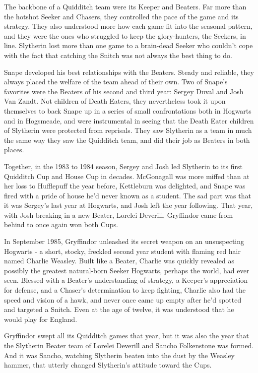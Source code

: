 \documentclass[a4paper,11pt]{article}
\begin{document}
The backbone of a Quidditch team were its Keeper and Beaters. Far more than the hotshot Seeker and Chasers, they controlled the pace of the game and its strategy. They also understood more how each game fit into the seasonal pattern, and they were the ones who struggled to keep the glory-hunters, the Seekers, in line. Slytherin lost more than one game to a brain-dead Seeker who couldn't cope with the fact that catching the Snitch was not always the best thing to do.

Snape developed his best relationships with the Beaters. Steady and reliable, they always placed the welfare of the team ahead of their own. Two of Snape's favorites were the Beaters of his second and third year: Sergey Duval and Josh Van Zandt. Not children of Death Eaters, they nevertheless took it upon themselves to back Snape up in a series of small confrontations both in Hogwarts and in Hogsmeade, and were instrumental in seeing that the Death Eater children of Slytherin were protected from reprisals. They saw Slytherin as a team in much the same way they saw the Quidditch team, and did their job as Beaters in both places.

Together, in the 1983 to 1984 season, Sergey and Josh led Slytherin to its first Quidditch Cup and House Cup in decades. McGonagall was more miffed than at her loss to Hufflepuff the year before, Kettleburn was delighted, and Snape was fired with a pride of house he'd never known as a student. The sad part was that it was Sergey's last year at Hogwarts, and Josh left the year following. That year, with Josh breaking in a new Beater, Lorelei Deverill, Gryffindor came from behind to once again won both Cups.

In September 1985, Gryffindor unleashed its secret weapon on an unsuspecting Hogwarts - a short, stocky, freckled second year student with flaming red hair named Charlie Weasley. Built like a Beater, Charlie was quickly revealed as possibly the greatest natural-born Seeker Hogwarts, perhaps the world, had ever seen. Blessed with a Beater's understanding of strategy, a Keeper's appreciation for defense, and a Chaser's determination to keep fighting, Charlie also had the speed and vision of a hawk, and never once came up empty after he'd spotted and targeted a Snitch. Even at the age of twelve, it was understood that he would play for England.

Gryffindor swept all its Quidditch games that year, but it was also the year that the Slytherin Beater team of Lorelei Deverill and Sancho Folkenstone was formed. And it was Sancho, watching Slytherin beaten into the dust by the Weasley hammer, that utterly changed Slytherin's attitude toward the Cups.
\end{document}
